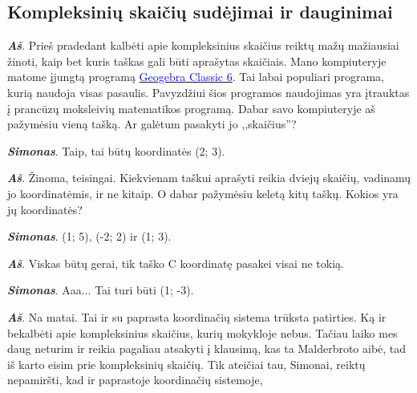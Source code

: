 \documentclass[a4paper]{article}
\newcommand{\goto}[2]{\href{\detokenize{#1}}{\textcolor{blue}{#2}}}
\newcommand{\say}[1]{\textbf{\textit{#1}}}
\begin{document}
\subsection*{Kompleksinių skaičių sudėjimai ir dauginimai}
\noindent\begin{minipage}[b]{0.69\textwidth}
\say{Aš}. Prieš pradedant kalbėti apie kompleksinius skaičius reiktų mažų mažiausiai žinoti, kaip bet kuris taškas gali būti aprašytas skaičiais. Mano kompiuteryje matome įjungtą programą \goto{https://www.geogebra.org/download}{Geogebra Classic 6}. Tai labai populiari programa, kurią naudoja visas pasaulis. Pavyzdžiui šios programos naudojimas yra įtrauktas į prancūzų moksleivių matematikos programą. Dabar savo kompiuteryje aš pažymėsiu vieną tašką. Ar galėtum pasakyti jo ,,skaičius''?

\say{Simonas}. Taip, tai būtų koordinatės (2; 3).

\say{Aš}. Žinoma, teisingai. Kiekvienam taškui aprašyti reikia dviejų skaičių, vadinamų jo koordinatėmis, ir ne kitaip. O dabar pažymėsiu keletą kitų taškų. Kokios yra jų koordinatės?

\say{Simonas}. (1; 5), (-2; 2) ir (1; 3).

\say{Aš}. Viskas būtų gerai, tik taško C koordinatę pasakei visai ne tokią.

\say{Simonas}. Aaa... Tai turi būti (1; -3).

\say{Aš}. Na matai. Tai ir su paprasta koordinačių sistema trūksta patirties. Ką ir bekalbėti apie kompleksinius skaičius, kurių mokykloje nebus. Tačiau laiko mes daug neturim ir reikia pagaliau atsakyti į klausimą, kas ta Malderbroto aibė, tad iš karto eisim prie kompleksinių skaičių. Tik ateičiai tau, Simonai, reiktų nepamiršti, kad ir paprastoje koordinačių sistemoje,\end{minipage}
\end{document}
